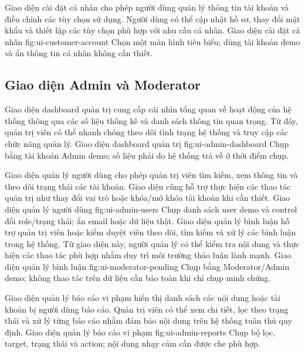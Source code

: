Giao diện cài đặt cá nhân cho phép người dùng quản lý thông tin tài khoản và điều chỉnh các tùy chọn sử dụng. Người dùng có thể cập nhật hồ sơ, thay đổi mật khẩu và thiết lập các tùy chọn phù hợp với nhu cầu cá nhân.
  {Giao diện cài đặt cá nhân}
  {fig:ui-customer-account}
  {Chọn một màn hình tiêu biểu; dùng tài khoản demo và ẩn thông tin cá nhân không cần thiết.}

\subsection{Giao diện Admin và Moderator}

Giao diện dashboard quản trị cung cấp cái nhìn tổng quan về hoạt động của hệ thống thông qua các số liệu thống kê và danh sách thông tin quan trọng. Từ đây, quản trị viên có thể nhanh chóng theo dõi tình trạng hệ thống và truy cập các chức năng quản lý.
  {Giao diện dashboard quản trị}
  {fig:ui-admin-dashboard}
  {Chụp bằng tài khoản Admin demo; số liệu phải do hệ thống trả về ở thời điểm chụp.}

Giao diện quản lý người dùng cho phép quản trị viên tìm kiếm, xem thông tin và theo dõi trạng thái các tài khoản. Giao diện cũng hỗ trợ thực hiện các thao tác quản trị như thay đổi vai trò hoặc khóa/mở khóa tài khoản khi cần thiết.
  {Giao diện quản lý người dùng}
  {fig:ui-admin-users}
  {Chụp danh sách user demo và control đổi role/trạng thái; ẩn email hoặc dữ liệu thật.}
\clearpage
Giao diện quản lý bình luận hỗ trợ quản trị viên hoặc kiểm duyệt viên theo dõi, tìm kiếm và xử lý các bình luận trong hệ thống. Từ giao diện này, người quản lý có thể kiểm tra nội dung và thực hiện các thao tác phù hợp nhằm duy trì môi trường thảo luận lành mạnh.
  {Giao diện quản lý bình luận}
  {fig:ui-moderator-pending}
  {Chụp bằng Moderator/\allowbreak{}Admin demo; không thao tác trên dữ liệu cần bảo toàn khi chỉ chụp minh chứng.}

Giao diện quản lý báo cáo vi phạm hiển thị danh sách các nội dung hoặc tài khoản bị người dùng báo cáo. Quản trị viên có thể xem chi tiết, lọc theo trạng thái và xử lý từng báo cáo nhằm đảm bảo nội dung trên hệ thống tuân thủ quy định.
  {Giao diện quản lý báo cáo vi phạm}
  {fig:ui-admin-reports}
  {Chụp bộ lọc, target, trạng thái và action; nội dung nhạy cảm cần được che phù hợp.}

